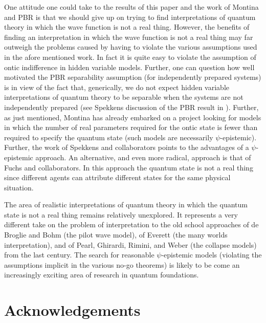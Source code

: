 \documentclass[12pt]{article}
\begin{document}
One attitude one could take to the results of this paper and the work of Montina and PBR is that we should give up on trying to find interpretations of quantum theory in which the wave
function is not a real thing.   However, the benefits of finding an interpretation in which the wave function is not a real thing may far outweigh the problems caused by having to violate
the various assumptions used in the afore mentioned work.  In fact it is quite easy to violate the assumption of ontic indifference in hidden variable models.  Further, one can question how well motivated the PBR separability assumption (for independently prepared systems) is in view of the fact that, generically, we do not expect hidden variable interpretations of quantum theory to be separable when the systems are not independently prepared (see Spekkens discussion of the PBR result in \cite{spekkens2012why}).   Further, as just mentioned, Montina has already embarked on a project looking for models in which the number of real parameters
required for the ontic state is fewer than required to specify the quantum state (such models are necessarily $\psi$-epistemic).   Further, the work of Spekkens and collaborators
\cite{spekkens2007evidence, bartlett2011reconstruction} points to the advantages of a $\psi$-epistemic approach. An alternative, and even more radical, approach is that of Fuchs \cite{fuchs2010qbism} and collaborators. In this approach the quantum state is not a real thing since different agents can attribute different states for the same physical situation.

The area of realistic interpretations of quantum theory in which the quantum state is not a real thing remains relatively unexplored.  It
represents a very different take on the problem of interpretation to the old school approaches of de Broglie and Bohm (the pilot wave model), of Everett (the many worlds interpretation), and of Pearl, Ghirardi, Rimini, and Weber (the collapse models) from the last century.  The search for reasonable $\psi$-epistemic models (violating the assumptions implicit in the various no-go theorems) is likely to be come an increasingly exciting area of research in quantum foundations.






\section*{Acknowledgements}
\end{document}
